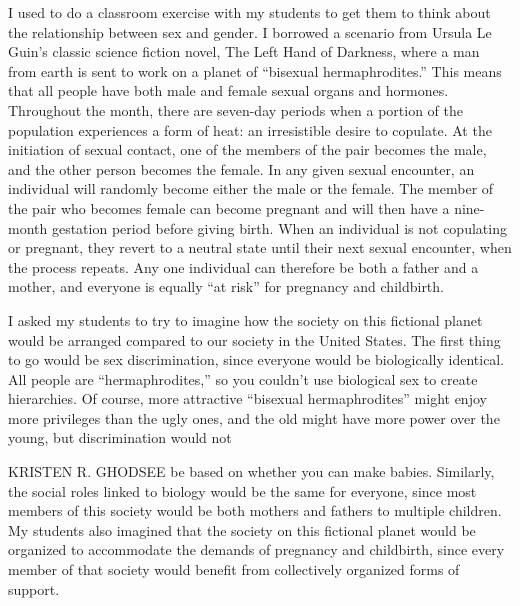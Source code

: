 I used to do a classroom exercise with my students to get them to think about the relationship between sex and gender. I borrowed a scenario from Ursula Le Guin’s classic science fiction novel, The Left Hand of Darkness, where a man from earth is sent to work on a planet of “bisexual hermaphrodites.” This means that all people have both male and female sexual organs and hormones. Throughout the month, there are seven-day periods when a portion of the population experiences a form of heat: an irresistible desire to copulate. At the initiation of sexual contact, one of the members of the pair becomes the male, and the other person becomes the female. In any given sexual encounter, an individual will randomly become either the male or the female. The member of the pair who becomes female can become pregnant and will then have a nine-month gestation period before giving birth. When an individual is not copulating or pregnant, they revert to a neutral state until their next sexual encounter, when the process repeats. Any one individual can therefore be both a father and a mother, and everyone is equally “at risk” for pregnancy and childbirth.
 \par 
I asked my students to try to imagine how the society on this fictional planet would be arranged compared to our society in the United States. The first thing to go would be sex discrimination, since everyone would be biologically identical. All people are “hermaphrodites,” so you couldn't use biological sex to create hierarchies. Of course, more attractive “bisexual hermaphrodites” might enjoy more privileges than the ugly ones, and the old might have more power over the young, but discrimination would not
 \par 
KRISTEN R. GHODSEE be based on whether you can make babies. Similarly, the social roles linked to biology would be the same for everyone, since most members of this society would be both mothers and fathers to multiple children. My students also imagined that the society on this fictional planet would be organized to accommodate the demands of pregnancy and childbirth, since every member of that society would benefit from collectively organized forms of support.
 \par 
